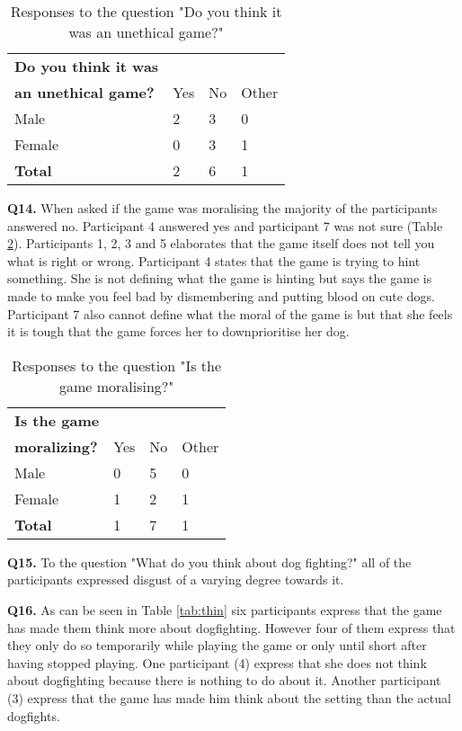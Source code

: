 \begin{table}[h]
\centering
\begin{tabular}{l l l l}
\hline
\textbf{Do you think it was}\\
\textbf{an unethical game?} & Yes & No & Other \\
\hline
Male & 2 & 3 & 0 \\
Female & 0 & 3 & 1 \\
\textbf{Total} & 2 & 6 & 1 \\
\hline
\end{tabular}
\caption{\label{tab:ethi}Responses to the question "Do you think it was an unethical game?"}
\end{table}


\textbf{Q14.} When asked if the game was moralising the majority of the participants answered no. Participant 4 answered yes and participant 7 was not sure (Table \ref{tab:mora}). Participants 1, 2, 3 and 5 elaborates that the game itself does not tell you what is right or wrong. Participant 4 states that the game is trying to hint something. She is not defining what the game is hinting but says the game is made to make you feel bad by dismembering and putting blood on cute dogs. Participant 7 also cannot define what the moral of the game is but that she feels it is tough that the game forces her to downprioritise her dog.

\begin{table}[h]
\centering
\begin{tabular}{l l l l}
\hline
\textbf{Is the game}\\
\textbf{moralizing?} & Yes & No & Other \\
\hline
Male & 0 & 5 & 0 \\
Female & 1 & 2 & 1 \\
\textbf{Total} & 1 & 7 & 1 \\
\hline
\end{tabular}
\caption{\label{tab:mora}Responses to the question "Is the game moralising?"}
\end{table}


\textbf{Q15.} To the question "What do you think about dog fighting?" all of the participants expressed disgust of a varying degree towards it. 


\textbf{Q16.} As can be seen in Table \ref{tab:thin} six participants express that the game has made them think more about dogfighting. However four of them express that they only do so temporarily while playing the game or only until short after having stopped playing. One participant (4) express that she does not think about dogfighting because there is nothing to do about it. Another participant (3) express that the game has made him think about the setting than the actual dogfights.

